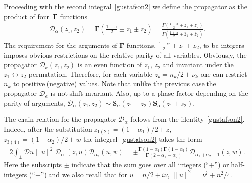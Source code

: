 \documentclass[pdftex]{sigma}
\numberwithin{equation}{section}
\begin{document}
Proceeding with the second integral~\eqref{gustafson2} we define the propagator as the product of four~$\boldsymbol\Gamma$ functions
\begin{gather*}
\boldsymbol {\mathcal D}_\alpha(z_1,z_2)= \boldsymbol\Gamma\left(\frac{1-\alpha}{2}\pm z_1 \pm z_2\right) =
\frac{\Gamma\left(\frac{1-\alpha}{2}\pm z_1 \pm z_2\right)}{\Gamma\left(
 \frac{1+\bar \alpha}{2}\pm \bar z_1 \pm \bar z_2\right)} .
\end{gather*}
The requirement for the arguments of $\boldsymbol\Gamma$ functions, $\frac{1-\alpha}{2}\pm z_1 \pm z_2$, to be integers imposes obvious restrictions on the relative parity of all variables. Obviously, the propagator $\boldsymbol {\mathcal D}_\alpha(z_1,z_2)$ is an even function of $z_1$, $z_2$ and invariant under the $z_1\leftrightarrow z_2$ permutation. Therefore, for each variable $z_k=n_k/2+\nu_k$ one can restrict $n_k$ to positive (negative) values. Note that unlike the previous case the pro\-pa\-ga\-tor $\boldsymbol {\mathcal D}_\alpha$ is not shift invariant. Also, up to a phase factor depending on the parity of arguments, $\boldsymbol {\mathcal D}_\alpha(z_1,z_2)\sim \boldsymbol S_\alpha(z_1-z_2)\boldsymbol S_\alpha(z_1+z_2)$.

The chain relation for the propagator $\boldsymbol {\mathcal D}_\alpha$ follows from the identity~\eqref{gustafson2}. Indeed, after the substitution $z_{1(2)}=(1-\alpha_1)/2\pm z$, $z_{3(4)}=(1-\alpha_2)/2\pm w$ the integral~\eqref{gustafson2} takes the form
\begin{gather*}
2\int_\pm \mathcal{D} u \|u\|^2 \boldsymbol {\mathcal D}_{\alpha_1}(z,u) \boldsymbol {\mathcal D}_{\alpha_2}(u,w) =
\pm \frac{\boldsymbol\Gamma(1-\alpha_1)\boldsymbol\Gamma(1-\alpha_2)}{
\boldsymbol\Gamma(2-\alpha_1-\alpha_2)}
\boldsymbol {\mathcal D}_{\alpha_1+\alpha_2-1}(z, w) .
\end{gather*}
Here the subscripts $\pm$ indicate that the sum goes over all integers (``$+$'') or half-integers (``$-$'') and we also recall that for $u=n/2+i \nu$, $\|u\|^2=\nu^2+n^2/4$.
\end{document}
